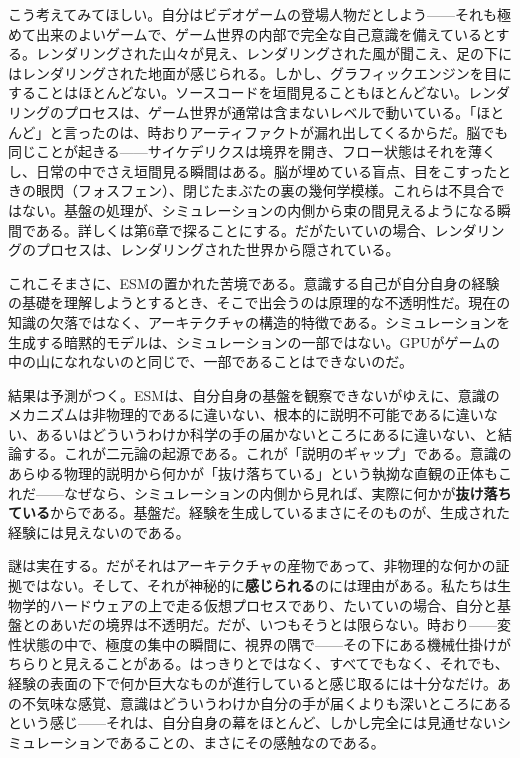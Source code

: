 \documentclass[11pt, twoside, openright]{book}
\begin{document}
こう考えてみてほしい。自分はビデオゲームの登場人物だとしよう------それも極めて出来のよいゲームで、ゲーム世界の内部で完全な自己意識を備えているとする。レンダリングされた山々が見え、レンダリングされた風が聞こえ、足の下にはレンダリングされた地面が感じられる。しかし、グラフィックエンジンを目にすることはほとんどない。ソースコードを垣間見ることもほとんどない。レンダリングのプロセスは、ゲーム世界が通常は含まないレベルで動いている。「ほとんど」と言ったのは、時おりアーティファクトが漏れ出してくるからだ。脳でも同じことが起きる------サイケデリクスは境界を開き、フロー状態はそれを薄くし、日常の中でさえ垣間見る瞬間はある。脳が埋めている盲点、目をこすったときの眼閃（フォスフェン）、閉じたまぶたの裏の幾何学模様。これらは不具合ではない。基盤の処理が、シミュレーションの内側から束の間見えるようになる瞬間である。詳しくは第6章で探ることにする。だがたいていの場合、レンダリングのプロセスは、レンダリングされた世界から隠されている。

これこそまさに、ESMの置かれた苦境である。意識する自己が自分自身の経験の基礎を理解しようとするとき、そこで出会うのは原理的な不透明性だ。現在の知識の欠落ではなく、アーキテクチャの構造的特徴である。シミュレーションを生成する暗黙的モデルは、シミュレーションの一部ではない。GPUがゲームの中の山になれないのと同じで、一部であることはできないのだ。

結果は予測がつく。ESMは、自分自身の基盤を観察できないがゆえに、意識のメカニズムは非物理的であるに違いない、根本的に説明不可能であるに違いない、あるいはどういうわけか科学の手の届かないところにあるに違いない、と結論する。これが二元論の起源である。これが「説明のギャップ」である。意識のあらゆる物理的説明から何かが「抜け落ちている」という執拗な直観の正体もこれだ------なぜなら、シミュレーションの内側から見れば、実際に何かが\textbf{抜け落ちている}からである。基盤だ。経験を生成しているまさにそのものが、生成された経験には見えないのである。

謎は実在する。だがそれはアーキテクチャの産物であって、非物理的な何かの証拠ではない。そして、それが神秘的に\textbf{感じられる}のには理由がある。私たちは生物学的ハードウェアの上で走る仮想プロセスであり、たいていの場合、自分と基盤とのあいだの境界は不透明だ。だが、いつもそうとは限らない。時おり------変性状態の中で、極度の集中の瞬間に、視界の隅で------その下にある機械仕掛けがちらりと見えることがある。はっきりとではなく、すべてでもなく、それでも、経験の表面の下で何か巨大なものが進行していると感じ取るには十分なだけ。あの不気味な感覚、意識はどういうわけか自分の手が届くよりも深いところにあるという感じ------それは、自分自身の幕をほとんど、しかし完全には見通せないシミュレーションであることの、まさにその感触なのである。
\end{document}
